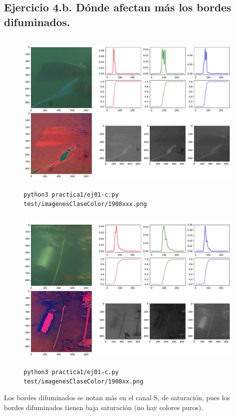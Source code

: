 \documentclass[11pt, spanish]{article}
\begin{document}
\subsection{Ejercicio 4.b. Dónde afectan más los bordes difuminados.}
\begin{figure}[H]
\centering
  \includegraphics[height=8cm]{informe-imgs/ej04-4.pdf}
  \caption{\texttt{python3 practica1/ej01-c.py test/imagenesClaseColor/1908xxx.png}}
\end{figure}
\begin{figure}[H]
\centering
  \includegraphics[height=8cm]{informe-imgs/ej04-5.pdf}
  \caption{\texttt{python3 practica1/ej01-c.py test/imagenesClaseColor/1908xx.png}}
\end{figure}

Los bordes difuminados se notan más en el canal S, de saturación, pues los bordes difuminados tienen baja saturación (no
hay colores puros).
\end{document}
